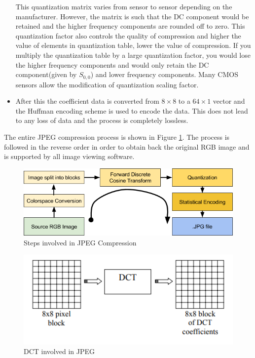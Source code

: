 \begin{itemize}
This quantization matrix varies from sensor to sensor depending on the manufacturer. However, the matrix is such that the DC component would be retained and the higher frequency components are rounded off to zero. This quantization factor also controls the quality of compression and higher the value of elements in quantization table, lower the value of compression. If you multiply the quantization table by a large quantization factor, you would lose the higher frequency components and would only retain the DC component(given by $S_{0,0}$) and lower frequency components. Many CMOS sensors allow the modification of quantization scaling factor.
\item After this the coefficient data is converted from $8 \times 8$ to a $64 \times 1$ vector and the Huffman encoding scheme is used to encode the data. This does not lead to any loss of data and the process is completely lossless.
\end{itemize}
The entire JPEG compression process is shown in Figure \ref{fig:jpeg}. The process is followed in the reverse order in order to obtain back the original RGB image and is supported by all image viewing software.

\begin{figure}[]
\centering
\includegraphics[scale=0.50]{pics/jpegcompression.png}
\caption{Steps involved in JPEG Compression\cite{Jpeg}}
\label{fig:jpeg}
\end{figure}

\begin{figure}[]
\centering
\includegraphics[scale=1]{pics/dct.PNG}
\caption{DCT involved in JPEG\cite{dct}}
\label{fig:dct}
\end{figure}
